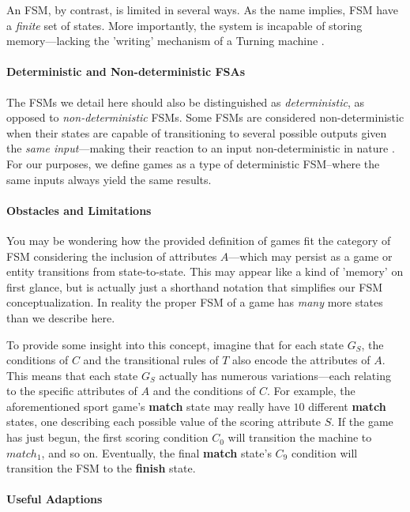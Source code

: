 \documentclass{report}
\newcommand{\state}[1]{\textbf{#1}}
\begin{document}
An FSM, by contrast, is limited in several ways. As the name implies, FSM have a \emph{finite} set of states. More importantly, the system is incapable of storing memory---lacking the 'writing' mechanism of a Turning machine \cite{FSM}. 

\paragraph{Deterministic and Non-deterministic FSAs}

The FSMs we detail here should also be distinguished as \emph{deterministic}, as opposed to \emph{non-deterministic} FSMs. Some FSMs are considered non-deterministic when their states are capable of transitioning to several possible outputs given the \emph{same input}---making their reaction to an input non-deterministic in nature \cite{NDFSA}. For our purposes, we define games as a type of deterministic FSM--where the same inputs always yield the same results. 

\paragraph{Obstacles and Limitations}
You may be wondering how the provided definition of games fit the category of FSM considering the inclusion of attributes $A$---which may persist as a game or entity transitions from state-to-state. This may appear like a kind of 'memory' on first glance, but is actually just a shorthand notation that simplifies our FSM conceptualization. In reality the proper FSM of a game has \emph{many} more states than we describe here. 

To provide some insight into this concept, imagine that for each state $G_S$, the conditions of $C$ and the transitional rules of $T$ also encode the attributes of $A$. This means that each state $G_S$ actually has numerous variations---each relating to the specific attributes of $A$ and the conditions of $C$. For example, the aforementioned sport game's \state{match} state may really have $10$ different \state{match} states, one describing each possible value of the scoring attribute $S$. If the game has just begun, the first scoring condition $C_0$ will transition the machine to $match_1$, and so on. Eventually, the final \state{match} state's $C_9$ condition will transition the FSM to the \state{finish} state.


\paragraph{Useful Adaptions}
\end{document}
